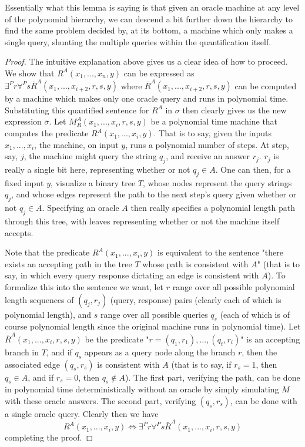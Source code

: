 Essentially what this lemma is saying is that given an oracle machine at any level of the polynomial hierarchy, we can descend a bit further down the hierarchy to find the same problem decided by, at its bottom, a machine which only makes a single query, shunting the multiple queries within the quantification itself.
\begin{proof}
	The intuitive explanation above gives us a clear idea of how to proceed. We show that $R^A(x_1,...,x_n,y)$ can be expressed as $\exists^P r \forall^P s \bar{R}^A(x_1,...,x_{i+2},r,s,y)$ where $\bar{R}^A(x_1,...,x_{i+2},r,s,y)$ can be computed by a machine which makes only one oracle query and runs in polynomial time. Substituting this quantified sentence for $R^A$ in $\sigma$ then clearly gives us the new expression $\bar{\sigma}$. Let $M^A_R(x_1,...,x_i,r,s,y)$ be a polynomial time machine that computes the predicate $R^A(x_1,...,x_i,y)$. That is to say, given the inputs $x_1,...,x_i$, the machine, on input $y$, runs a polynomial number of steps. At step, say, $j$, the machine might query the string $q_j$, and receive an answer $r_j$. $r_j$ is really a single bit here, representing whether or not $q_j \in A$. One can then, for a fixed input $y$, visualize a binary tree $T$, whose nodes represent the query strings $q_j$, and whose edges represent the path to the next step's query given whether or not $q_j \in A$. Specifying an oracle $A$ then really specifies a polynomial length path through this tree, with leaves representing whether or not the machine itself accepts. \par 
	Note that the predicate $R^A(x_1,...,x_i,y)$ is equivalent to the sentence "there exists an accepting path in the tree $T$ whose path is consistent with $A$" (that is to say, in which every query response dictating an edge is consistent with $A$). To formalize this into the sentence we want, let $r$ range over all possible polynomial length sequences of $(q_j,r_j)$ (query, response) pairs (clearly each of which is polynomial length), and $s$ range over all possible queries $q_s$ (each of which is of course polynomial length since the original machine runs in polynomial time). Let $\bar{R}^A(x_1,...,x_i,r,s,y)$ be the predicate "$r = (q_1,r_1),...,(q_t,r_i)$" is an accepting branch in $T$, and if $q_s$ appears as a query node along the branch $r$, then the associated edge $(q_s,r_s)$ is consistent with $A$ (that is to say, if $r_s = 1$, then $q_s \in A$, and if $r_s = 0$, then $q_s \notin A$). The first part, verifying the path, can be done in polynomial time deterministically without an oracle by simply simulating $M$ with these oracle answers. The second part, verifying $(q_s,r_s)$, can be done with a single oracle query. Clearly then we have 
	\[ R^A(x_1,...,x_i,y) \iff \exists^P r \forall^P s \bar{R}^A(x_1,...,x_i,r,s,y) \]
	completing the proof.
\end{proof}
